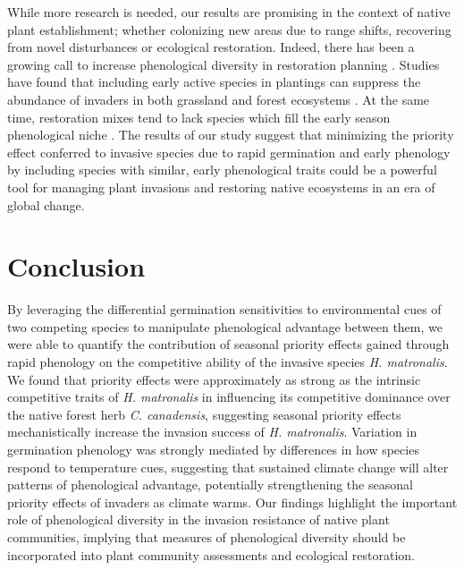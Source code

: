 \documentclass{article}[11pt]
\begin{document}
While more research is needed, our results are promising in the context of native plant establishment; whether colonizing new areas due to range shifts, recovering from novel disturbances or ecological restoration. Indeed, there has been a growing call to increase phenological diversity in restoration planning \citep{Hess:2019vn}. Studies have found that including early active species in plantings can suppress the abundance of invaders in both grassland \citep{Cleland:2013wo} and forest ecosystems \citep{Schuster:2020ww}. At the same time, restoration mixes tend to lack species which fill the early season phenological niche \citep{Havens:2016vo}. The results of our study suggest that minimizing the priority effect conferred to invasive species due to rapid germination and early phenology by including species with similar, early phenological traits could be a powerful tool for managing plant invasions and restoring native ecosystems in an era of global change.

\section*{Conclusion}
By leveraging the differential germination sensitivities to environmental cues of two competing species to manipulate phenological advantage between them, we were able to quantify the contribution of seasonal priority effects gained through rapid phenology on the competitive ability of the invasive species \textit{H. matronalis}. We found that priority effects were approximately as strong as the intrinsic competitive traits of \textit{H. matronalis} in influencing its competitive dominance over the native forest herb \textit{C. canadensis}, suggesting seasonal priority effects mechanistically increase the invasion success of \textit{H. matronalis}. Variation in germination phenology was strongly mediated by differences in how species respond to temperature cues, suggesting that sustained climate change will alter patterns of phenological advantage, potentially strengthening the seasonal priority effects of invaders as climate warms. Our findings highlight the important role of phenological diversity in the invasion resistance of native plant communities, implying that measures of phenological diversity should be incorporated into plant community assessments and ecological restoration. 
\end{document}
